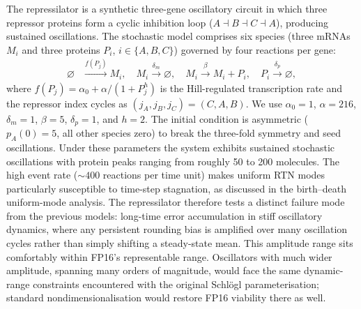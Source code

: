 \documentclass{article}
\begin{document}
The repressilator \cite{elowitz2000} is a synthetic three-gene oscillatory circuit in which three repressor proteins form a cyclic inhibition loop ($A \dashv B \dashv C \dashv A$), producing sustained oscillations. The stochastic model comprises six species (three mRNAs $M_i$ and three proteins $P_i$, $i \in \{A,B,C\}$) governed by four reactions per gene:
\begin{align*}
    \varnothing &\xrightarrow{f(P_j)} M_i, \quad M_i \xrightarrow{\delta_m} \varnothing, \quad M_i \xrightarrow{\beta} M_i + P_i, \quad P_i \xrightarrow{\delta_p} \varnothing,
\end{align*}
where $f(P_j) = \alpha_0 + \alpha/(1+P_j^h)$ is the Hill-regulated transcription rate and the repressor index cycles as $(j_A, j_B, j_C) = (C, A, B)$. We use $\alpha_0 = 1$, $\alpha = 216$, $\delta_m = 1$, $\beta = 5$, $\delta_p = 1$, and $h = 2$. The initial condition is asymmetric ($p_A(0) = 5$, all other species zero) to break the three-fold symmetry and seed oscillations. Under these parameters the system exhibits sustained stochastic oscillations with protein peaks ranging from roughly 50 to 200 molecules. The high event rate (${\sim}400$ reactions per time unit) makes uniform RTN modes particularly susceptible to time-step stagnation, as discussed in the birth--death uniform-mode analysis. The repressilator therefore tests a distinct failure mode from the previous models: long-time error accumulation in stiff oscillatory dynamics, where any persistent rounding bias is amplified over many oscillation cycles rather than simply shifting a steady-state mean. This amplitude range sits comfortably within FP16's representable range. Oscillators with much wider amplitude, spanning many orders of magnitude, would face the same dynamic-range constraints encountered with the original Schl\"{o}gl parameterisation; standard nondimensionalisation would restore FP16 viability there as well.
\end{document}
